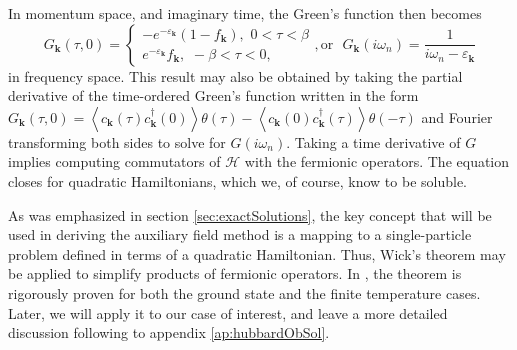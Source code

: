 In momentum space, and imaginary time, the Green's function then becomes
\begin{equation}
G_{\bm k} (\tau, 0 ) =
\begin{cases}
-e^{-\varepsilon_{\bm k}} ( 1 - f_{\bm k} ) , \,\, 0 < \tau < \beta \\
e^{-\varepsilon_{\bm k}} f_{\bm k} , \,\, -\beta < \tau < 0 ,
\end{cases} , \text{or} \,\,\,\,
G_{\bm k} ( i \omega_n ) = \frac{1}{i\omega_n - \varepsilon_{\bm k} }
\end{equation}
in frequency space. This result may also be obtained by taking the partial derivative of the time-ordered Green's function written in the form $
G_{\bm k} ( \tau, 0 ) = \left\langle c_{\bm k} ( \tau) c_{\bm k}^\dagger ( 0 ) \right\rangle \theta ( \tau ) - \left\langle c_{\bm k} ( 0 ) c_{\bm k}^\dagger ( \tau ) \right\rangle \theta ( -\tau )
$
 and Fourier transforming both sides to solve for $G ( i \omega_n )$.
Taking a time derivative of $G$ implies computing commutators of $\mathcal{H}$ with the fermionic operators.
The equation closes for quadratic Hamiltonians, which we, of course, know to be soluble.

As was emphasized in section \ref{sec:exactSolutions}, the key concept that will be used in deriving the auxiliary field method is a mapping to a single-particle problem defined in terms of a quadratic Hamiltonian.
Thus, Wick's theorem may be applied to simplify products of fermionic operators.
In \cite{fetter_quantum_2003}, the theorem is rigorously proven for both the ground state and the finite temperature cases.
Later, we will apply it to our case of interest, and leave a more detailed discussion following  \cite{molinari_notes_2017} to appendix \ref{ap:hubbardObSol}.

